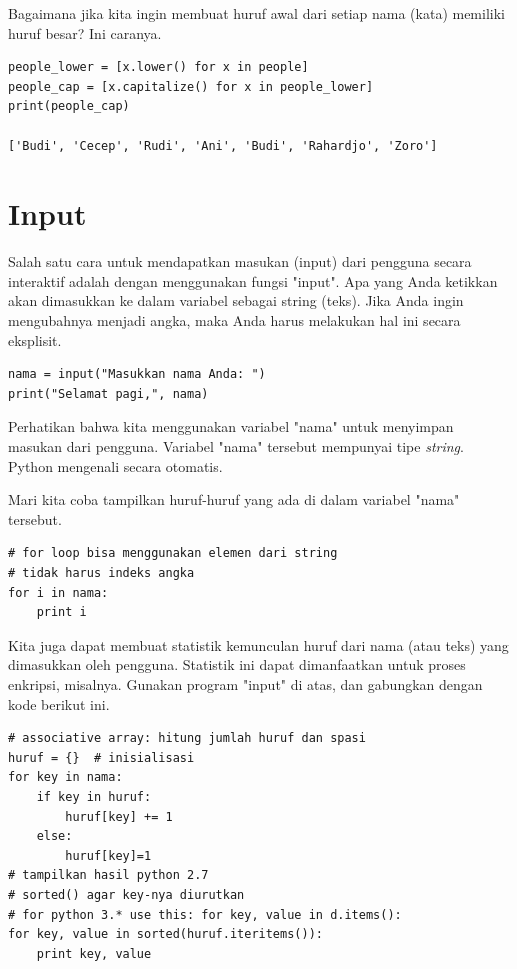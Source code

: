 Bagaimana jika kita ingin membuat huruf awal dari setiap nama (kata)
memiliki huruf besar? Ini caranya.

\begin{verbatim}
people_lower = [x.lower() for x in people]
people_cap = [x.capitalize() for x in people_lower]
print(people_cap)

['Budi', 'Cecep', 'Rudi', 'Ani', 'Budi', 'Rahardjo', 'Zoro']
\end{verbatim}

\section{Input}
Salah satu cara untuk mendapatkan masukan (input) dari pengguna secara
interaktif adalah dengan menggunakan fungsi "input".
Apa yang Anda ketikkan akan dimasukkan ke dalam variabel sebagai string
(teks). Jika Anda ingin mengubahnya menjadi angka, maka Anda harus
melakukan hal ini secara eksplisit.

\begin{verbatim}
nama = input("Masukkan nama Anda: ")
print("Selamat pagi,", nama)
\end{verbatim}

Perhatikan bahwa kita menggunakan variabel "nama" untuk menyimpan masukan
dari pengguna. Variabel "nama" tersebut mempunyai tipe {\em string}.
Python mengenali secara otomatis.

Mari kita coba tampilkan huruf-huruf yang ada di dalam variabel "nama"
tersebut.

\begin{verbatim}
# for loop bisa menggunakan elemen dari string
# tidak harus indeks angka
for i in nama:
    print i
\end{verbatim}

Kita juga dapat membuat statistik kemunculan huruf dari nama (atau teks)
yang dimasukkan oleh pengguna. Statistik ini dapat dimanfaatkan untuk
proses enkripsi, misalnya. Gunakan program "input" di atas, dan gabungkan
dengan kode berikut ini.

\begin{verbatim}
# associative array: hitung jumlah huruf dan spasi
huruf = {}  # inisialisasi
for key in nama:
    if key in huruf:
        huruf[key] += 1
    else:
        huruf[key]=1
# tampilkan hasil python 2.7
# sorted() agar key-nya diurutkan
# for python 3.* use this: for key, value in d.items():
for key, value in sorted(huruf.iteritems()):
    print key, value
\end{verbatim}

